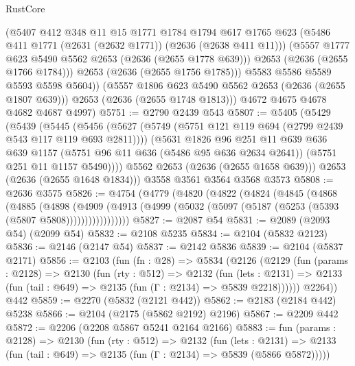 \begin{lexlean}{RustCore}
\begin{coremodule}
              (@5407
                @412
                @348
                @11
                @15
                @1771
                @1784
                @1794
                @617
                @1765
                @623
                (@5486 @411 @1771 (@2631 (@2632 @1771)) (@2636 (@2638 @411 @11)))
                (@5557 @1777 @623 @5490 @5562 @2653 (@2636 (@2655 @1778 @639)))
                @2653
                (@2636 (@2655 @1766 @1784)))
              @2653
              (@2636 (@2655 @1756 @1785)))
            @5583
            @5586
            @5589
            @5593
            @5598
            @5604))
        (@5557 @1806 @623 @5490 @5562 @2653 (@2636 (@2655 @1807 @639)))
        @2653
        (@2636 (@2655 @1748 @1813)))
      @4672
      @4675
      @4678
      @4682
      @4687
      @4997)
@5751 := @2790 @2439 @543
@5807 := @5405
    (@5429
      (@5439
        (@5445
          (@5456
            (@5627 (@5749 (@5751 @121 @119 @694 (@2799 @2439 @543 @117 @119 @693 @2811))))
            (@5631
              @1826
              @96
              @251
              @11
              @639
              @636
              @639
              @1157
              (@5751 @96 @11 @636 (@5486 @95 @636 @2634 @2641))
              (@5751 @251 @11 @1157 @5490))))
        @5562
        @2653
        (@2636 (@2655 @1658 @639)))
      @2653
      (@2636 (@2655 @1648 @1834)))
    @3558
    @3561
    @3564
    @3568
    @3573
@5808 := @2636 @3575
@5826 := @4754
    (@4779
      (@4820
        (@4822
          (@4824
            (@4845
              (@4868
                (@4885
                  (@4898
                    (@4909
                      (@4913 (@4999 (@5032 (@5097 (@5187 (@5253 (@5393 (@5807 @5808)))))))))))))))))
@5827 := @2087 @54
@5831 := @2089 (@2093 @54) (@2099 @54)
@5832 := @2108 @5235
@5834 := @2104 (@5832 @2123)
@5836 := @2146 (@2147 @54)
@5837 := @2142 @5836
@5839 := @2104 (@5837 @2171)
@5856 := @2103
    (fun (fn : @28) =>
    @5834
      (@2126
        (@2129
          (fun (params : @2128) =>
          @2130
            (fun (rty : @512) =>
            @2132
              (fun (lets : @2131) =>
              @2133 (fun (tail : @649) => @2135 (fun (Γ : @2134) => @5839 @2218))))))
        @2264))
    @442
@5859 := @2270 (@5832 (@2121 @442))
@5862 := @2183 (@2184 @442) @5238
@5866 := @2104 (@2175 (@5862 @2192) @2196)
@5867 := @2209 @442
@5872 := @2206 (@2208 @5867 @5241 @2164 @2166)
@5883 := fun (params : @2128) =>
  @2130
    (fun (rty : @512) =>
    @2132
      (fun (lets : @2131) =>
      @2133 (fun (tail : @649) => @2135 (fun (Γ : @2134) => @5839 (@5866 @5872)))))

\end{coremodule}
\end{lexlean}
